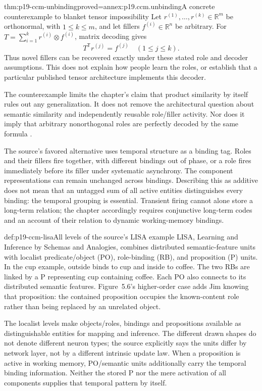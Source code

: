 \begin{hbtheorem}{thm:p19-ccm-unbinding}{proved=annex:p19.ccm.unbinding}{A concrete counterexample to blanket tensor impossibility}
Let \(r^{(1)},\ldots,r^{(k)}\in\mathbb R^m\) be orthonormal,
with \(1\leq k\leq m\), and let fillers
\(f^{(i)}\in\mathbb R^n\) be arbitrary. For
\(T=\sum_{i=1}^k r^{(i)}\otimes f^{(i)}\), matrix decoding gives
\[
                 T^{\mathsf T}r^{(j)}=f^{(j)}\quad(1\leq j\leq k).
\]
Thus novel fillers can be recovered exactly under these stated role
and decoder assumptions. This does not explain how people learn the
roles, or establish that a particular published tensor architecture
implements this decoder.
\end{hbtheorem}

The counterexample limits the chapter's claim that product similarity
by itself rules out any generalization. It does not remove the
architectural question about semantic similarity and independently
reusable role/filler activity. Nor does it imply that arbitrary
nonorthogonal roles are perfectly decoded by the same formula
\parencite[pp.~60--61]{DoumasHummel2012HigherCognition}.

The source's favored alternative uses temporal structure as a binding
tag. Roles and their fillers fire together, with different bindings
out of phase, or a role fires immediately before its filler under
systematic asynchrony. The component representations can remain
unchanged across bindings. Describing this as additive does not mean
that an untagged sum of all active entities distinguishes every
binding: the temporal grouping is essential. Transient firing cannot
alone store a long-term relation; the chapter accordingly requires
conjunctive long-term codes and an account of their relation to dynamic
working-memory bindings.

\begin{hbexample}{def:p19-ccm-lisa}{All levels of the source's LISA example}
LISA, Learning and Inference by Schemas and Analogies, combines
distributed semantic-feature units with localist predicate/object
(PO), role-binding (RB), and proposition (P) units. In the
cup example, outside binds to cup and inside to coffee. The two
RBs are linked by a P representing cup containing coffee. Each PO
also connects to its distributed semantic features. Figure~5.6's
higher-order case adds Jim knowing that proposition: the contained
proposition occupies the known-content role rather than being replaced
by an unrelated object.

The localist levels make objects/roles, bindings and propositions
available as distinguishable entities for mapping and inference.
The different drawn shapes do not denote different neuron types;
the source explicitly says the units differ by network layer, not
by a different intrinsic update law. When a proposition is active
in working memory, PO/semantic units additionally carry the temporal
binding information. Neither the stored P nor the mere activation
of all components supplies that temporal pattern by itself.
\end{hbexample}

